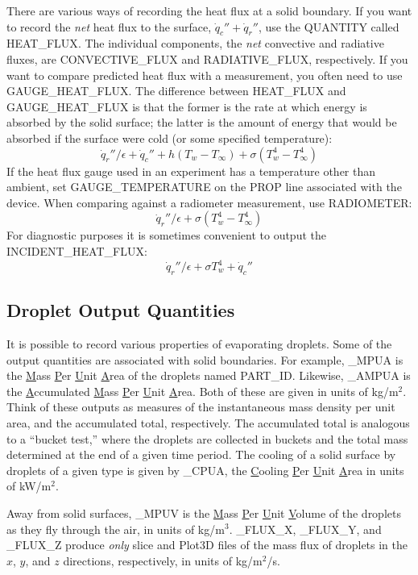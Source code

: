 \documentclass[11pt]{book}
\newcommand{\dq}{\dot{q}}
\begin{document}
There are various ways of recording the heat flux at a solid boundary. If you want to record the {\em net} heat flux to
the surface, $\dq_c'' + \dq_r''$, use the {\ct QUANTITY} called {\ct HEAT\_FLUX}. The individual components, the {\em net}
convective and radiative fluxes, are {\ct CONVECTIVE\_FLUX} and {\ct RADIATIVE\_FLUX}, respectively. If you want to compare
predicted heat flux with a measurement, you often need to use {\ct GAUGE\_HEAT\_FLUX}.
The difference between {\ct HEAT\_FLUX} and {\ct GAUGE\_HEAT\_FLUX} is that
the former is the rate at which energy is absorbed by the solid surface;
the latter is the amount of energy that would be absorbed if the surface were cold (or some specified temperature):
$$\dq_r''/\epsilon +\dq_c'' + h(T_w-T_\infty) + \sigma (T_w^4-T_\infty^4)$$
If the heat flux gauge used in an experiment has
a temperature other than ambient, set {\ct GAUGE\_TEMPERATURE} on the {\ct PROP} line associated with the device.
When comparing against a radiometer measurement, use {\ct RADIOMETER}:
$$\dq_r''/\epsilon + \sigma (T_w^4-T_\infty^4) $$
For diagnostic purposes it is sometimes convenient to output the {\ct INCIDENT\_HEAT\_FLUX}:
$$ \dq_r''/\epsilon + \sigma T_w^4 +\dq_c'' $$


\subsection{Droplet Output Quantities}
\label{info:part_output}

It is possible to record various properties of evaporating droplets. Some of the output quantities are associated with solid boundaries. For example,
{\ct [PART\_ID]\_MPUA} is the \underline{M}ass \underline{P}er \underline{U}nit \underline{A}rea of the droplets named
{\ct PART\_ID}. Likewise, {\ct [PART\_ID]\_AMPUA} is the \underline{A}ccumulated \underline{M}ass \underline{P}er \underline{U}nit \underline{A}rea. Both of these
are given in units of kg/m$^2$. Think of these outputs as measures of the instantaneous mass density per unit area, and the accumulated total, respectively. The
accumulated total is analogous to a ``bucket test,'' where the droplets are collected in buckets and the total mass determined at the end of a given time
period. The cooling of a solid surface by droplets of a given type is given by {\ct [PART\_ID]\_CPUA}, the \underline{C}ooling \underline{P}er \underline{U}nit \underline{A}rea
in units of kW/m$^2$.

Away from solid surfaces, {\ct [PART\_ID]\_MPUV} is the \underline{M}ass \underline{P}er \underline{U}nit \underline{V}olume of the droplets as they fly through
the air, in units of kg/m$^3$.  {\ct [PART\_ID]\_FLUX\_X},  {\ct [PART\_ID]\_FLUX\_Y}, and {\ct [PART\_ID]\_FLUX\_Z} produce {\em only} slice and Plot3D files
of the mass flux of droplets in the $x$, $y$, and $z$ directions, respectively, in units of kg/m$^2$/s.
\end{document}
